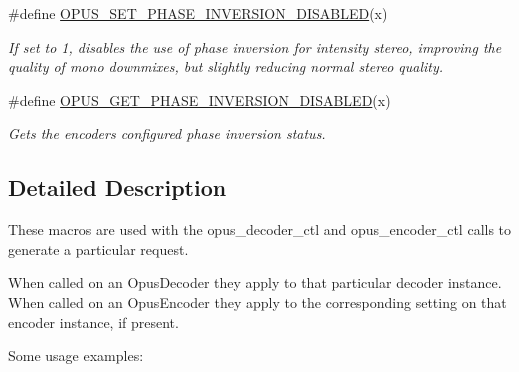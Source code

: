 \begin{DoxyCompactItemize}
\#define \hyperlink{group__opus__genericctls_ga10fa1f6eab136baf83c232afa989b6a8}{O\+P\+U\+S\+\_\+\+S\+E\+T\+\_\+\+P\+H\+A\+S\+E\+\_\+\+I\+N\+V\+E\+R\+S\+I\+O\+N\+\_\+\+D\+I\+S\+A\+B\+L\+ED}(x)
\begin{DoxyCompactList}\small\item\em If set to 1, disables the use of phase inversion for intensity stereo, improving the quality of mono downmixes, but slightly reducing normal stereo quality. \end{DoxyCompactList}\item 
\#define \hyperlink{group__opus__genericctls_gae9ad2f51fe4fe086f35e881682c4c247}{O\+P\+U\+S\+\_\+\+G\+E\+T\+\_\+\+P\+H\+A\+S\+E\+\_\+\+I\+N\+V\+E\+R\+S\+I\+O\+N\+\_\+\+D\+I\+S\+A\+B\+L\+ED}(x)
\begin{DoxyCompactList}\small\item\em Gets the encoder\textquotesingle{}s configured phase inversion status. \end{DoxyCompactList}\end{DoxyCompactItemize}


\subsection{Detailed Description}
These macros are used with the {\ttfamily opus\+\_\+decoder\+\_\+ctl} and {\ttfamily opus\+\_\+encoder\+\_\+ctl} calls to generate a particular request. 

When called on an {\ttfamily Opus\+Decoder} they apply to that particular decoder instance. When called on an {\ttfamily Opus\+Encoder} they apply to the corresponding setting on that encoder instance, if present.

Some usage examples\+:


